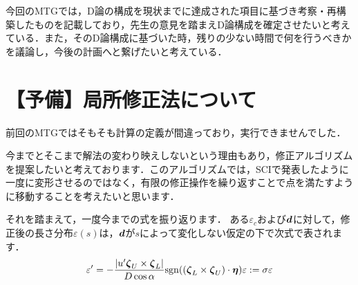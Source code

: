 \documentclass[16.7pt]{jsarticle}
\begin{document}
		
	\articleSPRobj
		今回のMTGでは，D論の構成を現状までに達成された項目に基づき考察・再構築したものを記載しており，先生の意見を踏まえD論構成を確定させたいと考えている．また，そのD論構成に基づいた時，残りの少ない時間で何を行うべきかを議論し，今後の計画へと繋げたいと考えている．
		

	\articleSPRitemsone
		
		\tableofcontents
		
		
	\articleSPRitemstwo
	\renewcommand{\labelitemi}{$\blacktriangledown$}
	\newcommand{\argmax}{\mathop{\rm arg~max}\limits}
	\newcommand{\argmin}{\mathop{\rm arg~min}\limits}
	\newcommand{\Ker}{{\rm Ker}}
	\newcommand{\rank}{{\rm rank}}
	\section{【予備】局所修正法について}
		前回のMTGではそもそも計算の定義が間違っており，実行できませんでした．
		
		今までとそこまで解法の変わり映えしないという理由もあり，修正アルゴリズムを提案したいと考えております．このアルゴリズムでは，SCIで発表したように一度に変形させるのではなく，有限の修正操作を繰り返すことで点を満たすように移動することを考えたいと思います．
		
		それを踏まえて，一度今までの式を振り返ります．
		ある$ \varepsilon_c $および$ \boldsymbol{d} $に対して，修正後の長さ分布$ \varepsilon(s) $は，$ \boldsymbol{d} $が$ s $によって変化しない仮定の下で次式で表されます．
		\begin{equation}\label{eq:varDiffeq}
			\varepsilon' = -\frac{|u'\boldsymbol{\zeta}_U\times \boldsymbol{\zeta}_L|}{D \cos \alpha} \mathrm{sgn}((\boldsymbol{\zeta}_L \times \boldsymbol{\zeta}_U) \cdot \boldsymbol{\eta})\varepsilon := \sigma \varepsilon
		\end{equation}
		
\end{document}
